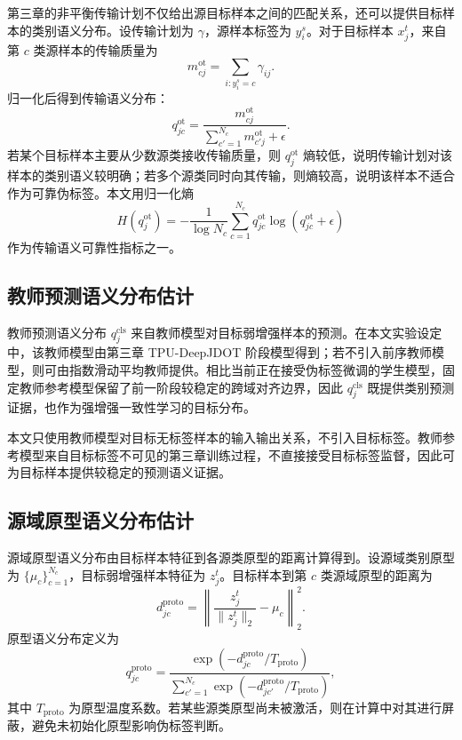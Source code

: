 \documentclass{seuthesis-2022}
\begin{document}
第三章的非平衡传输计划不仅给出源目标样本之间的匹配关系，还可以提供目标样本的类别语义分布。设传输计划为 $\gamma$，源样本标签为 $y_i^s$。对于目标样本 $x_j^t$，来自第 $c$ 类源样本的传输质量为
\begin{equation}
    m_{cj}^{\mathrm{ot}}
    =
    \sum_{i:y_i^s=c}
    \gamma_{ij}.
\end{equation}
归一化后得到传输语义分布：
\begin{equation}
    q_{jc}^{\mathrm{ot}}
    =
    \frac{
    m_{cj}^{\mathrm{ot}}
    }{
    \sum_{c'=1}^{N_c}m_{c'j}^{\mathrm{ot}}+\epsilon
    }.
\end{equation}
若某个目标样本主要从少数源类接收传输质量，则 $q_j^{\mathrm{ot}}$ 熵较低，说明传输计划对该样本的类别语义较明确；若多个源类同时向其传输，则熵较高，说明该样本不适合作为可靠伪标签。本文用归一化熵
\begin{equation}
    H(q_j^{\mathrm{ot}})
    =
    -\frac{1}{\log N_c}
    \sum_{c=1}^{N_c}
    q_{jc}^{\mathrm{ot}}\log(q_{jc}^{\mathrm{ot}}+\epsilon)
\end{equation}
作为传输语义可靠性指标之一。

\subsection{教师预测语义分布估计}

教师预测语义分布 $q_j^{\mathrm{cls}}$ 来自教师模型对目标弱增强样本的预测。在本文实验设定中，该教师模型由第三章 TPU-DeepJDOT 阶段模型得到；若不引入前序教师模型，则可由指数滑动平均教师提供。相比当前正在接受伪标签微调的学生模型，固定教师参考模型保留了前一阶段较稳定的跨域对齐边界，因此 $q_j^{\mathrm{cls}}$ 既提供类别预测证据，也作为强增强一致性学习的目标分布。

本文只使用教师模型对目标无标签样本的输入输出关系，不引入目标标签。教师参考模型来自目标标签不可见的第三章训练过程，不直接接受目标标签监督，因此可为目标样本提供较稳定的预测语义证据。

\subsection{源域原型语义分布估计}

源域原型语义分布由目标样本特征到各源类原型的距离计算得到。设源域类别原型为 $\{\mu_c\}_{c=1}^{N_c}$，目标弱增强样本特征为 $z_j^t$。目标样本到第 $c$ 类源域原型的距离为
\begin{equation}
    d_{jc}^{\mathrm{proto}}
    =
    \left\|
    \frac{z_j^t}{\|z_j^t\|_2}
    -
    \mu_c
    \right\|_2^2.
\end{equation}
原型语义分布定义为
\begin{equation}
    q_{jc}^{\mathrm{proto}}
    =
    \frac{
    \exp(-d_{jc}^{\mathrm{proto}}/T_{\mathrm{proto}})
    }{
    \sum_{c'=1}^{N_c}
    \exp(-d_{jc'}^{\mathrm{proto}}/T_{\mathrm{proto}})
    },
\end{equation}
其中 $T_{\mathrm{proto}}$ 为原型温度系数。若某些源类原型尚未被激活，则在计算中对其进行屏蔽，避免未初始化原型影响伪标签判断。
\end{document}

